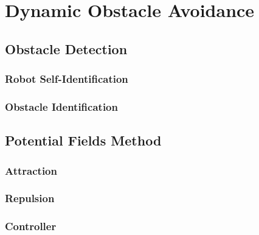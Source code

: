 \chapter{Dynamic Obstacle Avoidance}

\section{Obstacle Detection}

\subsection{Robot Self-Identification}

\subsection{Obstacle Identification}

\section{Potential Fields Method}

\subsection{Attraction}

\subsection{Repulsion}

\subsection{Controller}